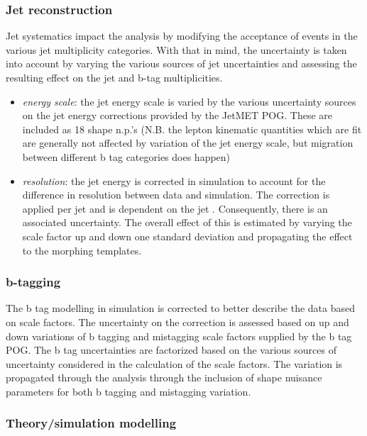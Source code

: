 \subsubsection{Jet reconstruction}

    Jet systematics impact the analysis by modifying the acceptance of
    events in the various jet multiplicity categories.  With that in
    mind, the uncertainty is taken into account by varying the various
    sources of jet uncertainties and assessing the resulting effect on
    the jet and b-tag multiplicities.

    \begin{itemize}
        \item \textit{energy scale}: the jet energy scale is varied by
            the various uncertainty sources on the jet energy
            corrections provided by the JetMET POG.  These are included
            as 18 shape n.p.'s (N.B. the lepton kinematic quantities
            which are fit are generally not affected by variation of the
            jet energy scale, but migration between different b tag
            categories does happen)
        \item \textit{resolution}: the jet energy is corrected in
            simulation to account for the difference in resolution
            between data and simulation.  The correction is applied per
            jet and is dependent on the jet \pt.  Consequently, there is
            an associated uncertainty.  The overall effect of this is
            estimated by varying the scale factor up and down one
            standard deviation and propagating the effect to the
            morphing templates.
    \end{itemize}

\subsubsection{b-tagging}
    
The b tag modelling in simulation is corrected to better describe the
data based on scale factors.  The uncertainty on the correction is
assessed based on up and down variations of b tagging and mistagging
scale factors supplied by the b tag POG.  The b tag uncertainties are
factorized based on the various sources of uncertainty considered in the
calculation of the scale factors.  The variation is propagated through
the analysis through the inclusion of shape nuisance parameters for both
b tagging and mistagging variation.

\subsubsection{Theory/simulation modelling}

